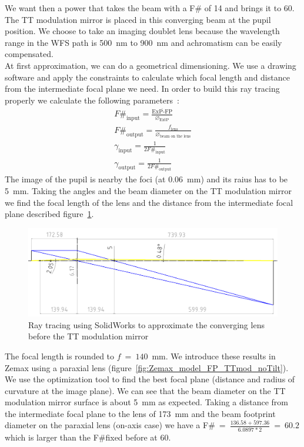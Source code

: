 \documentclass[12pt,a4paper]{article}
\begin{document}
We want then a power that takes the beam with a F\# of 14 and brings it to 60. The TT modulation mirror is placed in this converging beam at the pupil position. We choose to take an imaging doublet lens because the wavelength range in the WFS path is 500~nm to 900~nm and achromatism can be easily compensated.\\
At first approximation, we can do a geometrical dimensioning. We use a drawing software and apply the constraints to calculate which focal length and distance from the intermediate focal plane we need. In order to build this ray tracing properly we calculate the following parameters~:
\begin{eqnarray}
	F\#_\text{input} = \frac{\overline{\text{ExP-FP}}}{\diameter_{\text{ExtP}}}\nonumber\\
	F\#_\text{output} = \frac{f_\text{lens}}{\diameter_\text{beam on the lens}}\nonumber\\
	\gamma_\text{input} = \frac{1}{2F\#_\text{input}}\nonumber\\
	\gamma_\text{output} = \frac{1}{2F\#_\text{output}}\nonumber
\end{eqnarray}
The image of the pupil is nearby the foci (at 0.06~mm) and its raius has to be 5~mm. Taking the angles and the beam diameter on the TT modulation mirror we find the focal length of the lens and the distance from the intermediate focal plane described figure~\ref{fig:SW_trace_rayons_lens_TTMM}.
\begin{figure}[H]
	\begin{center}
		\includegraphics[width=.9\textwidth]{images/SW_trace_rayons_lens_TTMM.PNG}
		\caption{Ray tracing using SolidWorks to approximate the converging lens before the TT modulation mirror}\label{fig:SW_trace_rayons_lens_TTMM}
	\end{center}
\end{figure}
The focal length is rounded to $f~=~140$~mm. We introduce these results in Zemax using a paraxial lens (figure~\ref{fig:Zemax_model_FP_TTmod_noTilt}). We use the optimization tool to find the best focal plane (distance and radius of curvature at the image plane). We can see that the beam diameter on the TT modulation mirror surface is about 5~mm as expected. Taking a distance from the intermediate focal plane to the lens of 173~mm and the beam footprint diameter on the paraxial lens (on-axis case) we have a F\#$~=~\frac{136.58+597.36}{6.0897*2}~=~60.2$ which is larger than the F\#fixed before at 60.
\end{document}
